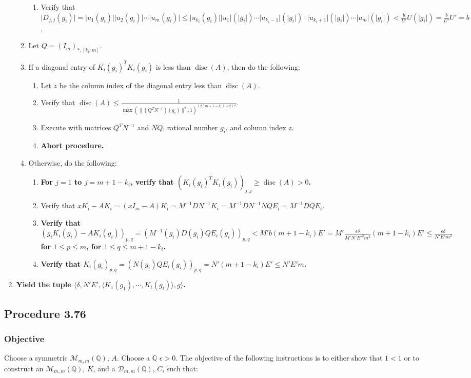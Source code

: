 \documentclass[twocolumn]{article}
\DeclareMathOperator{\disc}{disc}
\newcommand{\procedure}[2][]{\subsection*{Procedure #2 \ifthenelse{\equal{#1}{}}{}{(#1)}}\label{sec:procedure #2}}
\newcommand{\objective}{\subsubsection*{Objective}}
\newcommand{\procedurehr}[2][]{\hyperref[sec:procedure #2]{\ifthenelse{\equal{#1}{}}{procedure #2}{#1}}}
\begin{document}
\begin{enumerate}
\begin{enumerate}
\begin{enumerate}
							\item Verify that $\lvert D_{j,j}(g_i)\rvert=\lvert u_1(g_i)\rvert\lvert u_2(g_i)\rvert\cdots\lvert u_m(g_i)\rvert\le\lvert u_{k_i}(g_i)\rvert\lvert u_1\rvert(\lvert g_i\rvert)\cdots\lvert u_{k_i-1}\rvert(\lvert g_i\rvert)\cdot\lvert u_{k_i+1}\rvert(\lvert g_i\rvert)\cdots\lvert u_m\rvert(\lvert g_i\rvert)<\frac{b}{U'}U(\lvert g_i\rvert)=\frac{b}{U'}U'=b$.
						\end{enumerate}
						\item Let $Q=(I_m)_{*,[k_i:m]}$.
						\item If a diagonal entry of ${K_i(g_i)}^TK_i(g_i)$ is less than $\disc(A)$, then do the following:
						\begin{enumerate}
							\item Let $z$ be the column index of the diagonal entry less than $\disc(A)$.
							\item Verify that $\disc(A)\le\frac{1}{\max(\lVert (Q^TN^{-1})(g_i)\rVert^2,1)^{(2(m+1-k_i)+2)!!}}$.
							\item Execute \procedurehr{3.71} with matrices $Q^TN^{-1}$ and $NQ$, rational number $g_i$, and column index $z$.
							\item \textbf{Abort procedure.}
						\end{enumerate}
						\item Otherwise, do the following:
						\begin{enumerate}
							\item \textbf{For $j=1$ to $j=m+1-k_i$, verify that $({K_i(g_i)}^TK_i(g_i))_{j,j}\ge \disc(A)>0$.}
							\item Verify that $xK_i-AK_i=(xI_m-A)K_i=M^{-1}DN^{-1}K_i=M^{-1}DN^{-1}NQE_i=M^{-1}DQE_i$.
							\item \textbf{Verify that $(g_iK_i(g_i)-AK_i(g_i))_{p,q}=(M^{-1}(g_i)D(g_i)QE_i(g_i))_{p,q}<M'b(m+1-k_i)E'=M'\frac{\epsilon\delta}{M'N'E'^2m^3}(m+1-k_i)E'\le\frac{\epsilon\delta}{N'E'm^2}$ for $1\le p\le m$, for $1\le q\le m+1-k_i$.}
							\item \textbf{Verify that $K_i(g_i)_{p,q}=(N(g_i)QE_i(g_i))_{p,q}=N'(m+1-k_i)E'\le N'E'm$.}
						\end{enumerate}
					\end{enumerate}
					\item \textbf{Yield the tuple $\langle\delta,N'E',\langle K_1(g_1),\cdots,K_t(g_t)\rangle,g\rangle$.}
				\end{enumerate}
		\procedure{3.76}
			\objective
				Choose a symmetric $\mathcal{M}_{m,m}(\mathbb{Q})$, $A$. Choose a $\mathbb{Q}$ $\epsilon>0$. The objective of the following instructions is to either show that $1<1$ or to construct an $\mathcal{M}_{m,m}(\mathbb{Q})$, $K$, and a $\mathcal{D}_{m,m}(\mathbb{Q})$, $C$, such that:
\end{document}
